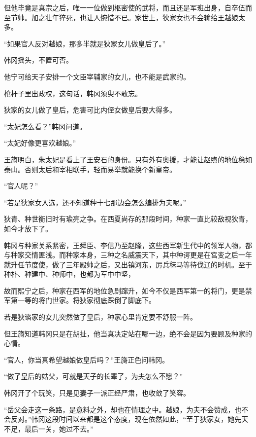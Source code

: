 但他毕竟是真宗之后，唯一一位做到枢密使的武将，而且还是军班出身，自卒伍而至节帅。加之壮年猝死，也让人惋惜不已。家世上，狄家女也不会输给王越娘太多。

“如果官人反对越娘，那多半就是狄家女儿做皇后了。”

韩冈摇头，不置可否。

他宁可给天子安排一个文臣宰辅家的女儿，也不能是武家的。

枪杆子里出政权，这句话，韩冈须臾不敢忘。

狄家的女儿做了皇后，危害可比内侄女做皇后要大得多。

“太妃怎么看？”韩冈问道。

“太妃好像更喜欢越娘。”

王旖明白，朱太妃是看上了王安石的身份。只有外有奥援，才能让赵煦的地位稳如泰山。否则太后和宰相联手，轻而易举就能换个新皇帝。

“官人呢？”

“若是狄家女入选，还不知道种十七那边会怎么编排为夫呢。”

狄青、种世衡旧时有瑜亮之争。在西夏尚存的那段时间，种家一直比较敌视狄青，如今才放下了。

韩冈与种家关系紧密，王舜臣、李信乃至赵隆，这些西军新生代中的领军人物，都与种家交情匪浅。而种家本身，三种之名威震天下，其中种谔更是在宫变之后一年就升任节度使，做了三年殿帅之后，又出镇河东，厉兵秣马等待伐辽的时机。至于种朴、种建中、种师中，也都为军中中坚，

故而熙宁之后，种家在西军的地位急剧蹿升，如今不仅是西军第一的将门，更是禁军第一等的将门世家。将狄家彻底踩倒了脚底下。

若是狄谘家的女儿突然做了皇后，种家心里肯定要不舒服一阵。

但王旖知道韩冈只是在胡扯，他当真决定站在哪一边，绝不会是因为要顾及种家的心情。

“官人，你当真希望越娘做皇后吗？”王旖正色问韩冈。

“做了皇后的姑父，可就是天子的长辈了，为夫怎么不愿？”

韩冈开了个玩笑，只是见妻子一派正经严肃，也收敛了笑容。

“岳父会走这一条路，是意料之外，却也在情理之中。越娘，为夫不会赞成，也不会反对。”韩冈这段时间以来都是这个态度，现在依然如此，“至于狄家女，她先天不足，最后一关，她过不去。”
